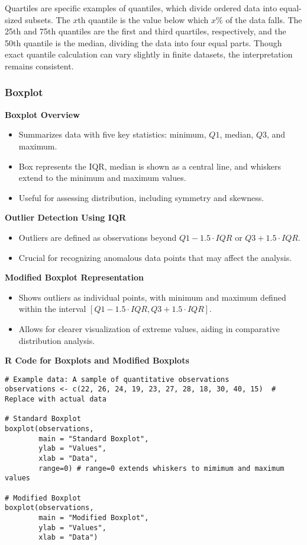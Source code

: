 \documentclass{article}
\begin{document}
Quartiles are specific examples of quantiles, which divide ordered data into equal-sized subsets. The $x$th quantile is the value below which $x\%$ of the data falls.  The 25th and 75th quantiles are the first and third quartiles, respectively, and the 50th quantile is the median, dividing the data into four equal parts. Though exact quantile calculation can vary slightly in finite datasets, the interpretation remains consistent.

\subsubsection{Boxplot}
\textbf{Boxplot Overview}
\begin{itemize}
    \item Summarizes data with five key statistics: minimum, $Q1$, median, $Q3$, and maximum.
    \item Box represents the IQR, median is shown as a central line, and whiskers extend to the minimum and maximum values.
    \item Useful for assessing distribution, including symmetry and skewness.
\end{itemize}

\textbf{Outlier Detection Using IQR}
\begin{itemize}
    \item Outliers are defined as observations beyond $Q1 - 1.5 \cdot IQR$ or $Q3 + 1.5 \cdot IQR$.
    \item Crucial for recognizing anomalous data points that may affect the analysis.
\end{itemize}

\textbf{Modified Boxplot Representation}
\begin{itemize}
    \item Shows outliers as individual points, with minimum and maximum defined within the interval $[Q1 - 1.5 \cdot IQR, Q3 + 1.5 \cdot IQR]$.
    \item Allows for clearer visualization of extreme values, aiding in comparative distribution analysis.
\end{itemize}

\textbf{R Code for Boxplots and Modified Boxplots}

\begin{lstlisting}
# Example data: A sample of quantitative observations
observations <- c(22, 26, 24, 19, 23, 27, 28, 18, 30, 40, 15)  # Replace with actual data

# Standard Boxplot
boxplot(observations, 
        main = "Standard Boxplot", 
        ylab = "Values",
        xlab = "Data",
        range=0) # range=0 extends whiskers to mimimum and maximum values

# Modified Boxplot
boxplot(observations, 
        main = "Modified Boxplot", 
        ylab = "Values",
        xlab = "Data")
\end{lstlisting}
\end{document}
